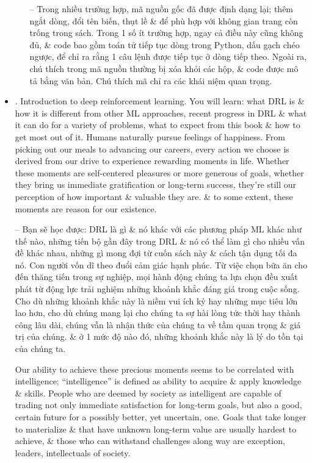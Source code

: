 \documentclass{article}
\begin{document}
\begin{itemize}
\begin{itemize}
        -- Trong nhiều trường hợp, mã nguồn gốc đã được định dạng lại; thêm ngắt dòng, đổi tên biến, thụt lề \& để phù hợp với không gian trang còn trống trong sách. Trong 1 số ít trường hợp, ngay cả điều này cũng không đủ, \& code bao gồm toán tử tiếp tục dòng trong Python, dấu gạch chéo ngược, để chỉ ra rằng 1 câu lệnh được tiếp tục ở dòng tiếp theo. Ngoài ra, chú thích trong mã nguồn thường bị xóa khỏi các hộp, \& code được mô tả bằng văn bản. Chú thích mã chỉ ra các khái niệm quan trọng.
    \end{itemize}
    \item {. Introduction to deep reinforcement learning.} You will learn: what DRL is \& how it is different from other ML approaches, recent progress in DRL \& what it can do for a variety of problems, what to expect from this book \& how to get most out of it. Humans naturally pursue feelings of happiness. From picking out our meals to advancing our careers, every action we choose is derived from our drive to experience rewarding moments in life. Whether these moments are self-centered pleasures or more generous of goals, whether they bring us immediate gratification or long-term success, they're still our perception of how important \& valuable they are. \& to some extent, these moments are reason for our existence.

    -- Bạn sẽ học được: DRL là gì \& nó khác với các phương pháp ML khác như thế nào, những tiến bộ gần đây trong DRL \& nó có thể làm gì cho nhiều vấn đề khác nhau, những gì mong đợi từ cuốn sách này \& cách tận dụng tối đa nó. Con người vốn dĩ theo đuổi cảm giác hạnh phúc. Từ việc chọn bữa ăn cho đến thăng tiến trong sự nghiệp, mọi hành động chúng ta lựa chọn đều xuất phát từ động lực trải nghiệm những khoảnh khắc đáng giá trong cuộc sống. Cho dù những khoảnh khắc này là niềm vui ích kỷ hay những mục tiêu lớn lao hơn, cho dù chúng mang lại cho chúng ta sự hài lòng tức thời hay thành công lâu dài, chúng vẫn là nhận thức của chúng ta về tầm quan trọng \& giá trị của chúng. \& ở 1 mức độ nào đó, những khoảnh khắc này là lý do tồn tại của chúng ta.

    Our ability to achieve these precious moments seems to be correlated with intelligence; ``intelligence'' is defined as ability to acquire \& apply knowledge \& skills. People who are deemed by society as intelligent are capable of trading not only immediate satisfaction for long-term goals, but also a good, certain future for a possibly better, yet uncertain, one. Goals that take longer to materialize \& that have unknown long-term value are usually hardest to achieve, \& those who can withstand challenges along way are exception, leaders, intellectuals of society.


\end{itemize}
\end{document}
